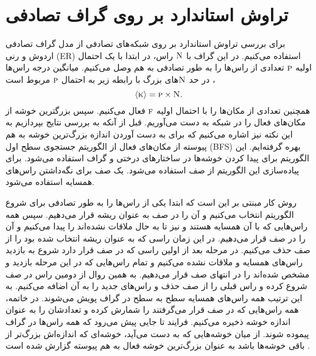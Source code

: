 \section{تراوش استاندارد بر روی گراف تصادفی}
   برای بررسی تراوش استاندارد بر روی شبکه‌های تصادفی از مدل گراف تصادفی اردوش و رنی (\textsc{ER}) استفاده می‌کنیم. در این گراف با 
   $\textsc{N}$ 
   راس، در ابتدا با یک احتمال اولیه 
   $\textsc{p}$ 
   تعدادی از راس‌ها را به طور تصادفی به هم وصل می‌کنیم. میانگین درجه راس‌ها در حد 
   $\textsc{N}$های بزرگ با رابطه زیر به احتمال
    $\textsc{p}$
     مربوط است \cite{newman}، 
   \begin{equation}
   {\left\langle \textsc{k} \right\rangle = \textsc{p}\times \textsc{N}}.
   \end{equation}
   همچنین تعدادی از مکان‌ها را با احتمال اولیه $\textsc{f}$ فعال می‌کنیم. سپس بزرگترین خوشه از مکان‌های فعال را در شبکه به دست می‌آوریم. 
    قبل از آنکه به بررسی نتایج بپردازیم به این نکته نیز اشاره می‌کنیم که برای به دست آوردن اندازه بزرگ‌ترین خوشه به هم پیوسته از مکان‌های فعال از الگوریتم جستجوی سطح اول (‌BFS) بهره گرفته‌ایم. این الگوریتم برای پیدا کردن خوشه‌ها در ساختار‌های درختی و گراف استفاده می‌شود. برای پیاده‌سازی این الگوریتم از صف استفاده می‌شود. یک صف برای نگه‌داشتن راس‌های همسایه استفاده می‌شود. 
   
   روش کار مبنتی بر این است که ابتدا یکی از راس‌ها را به طور تصادفی برای شروع الگوریتم انتخاب می‌کنیم و آن را در صف به عنوان ریشه قرار می‌دهیم. سپس همه راس‌هایی که با آن همسایه هستند و نیز تا به حال ملاقات نشده‌اند را پیدا می‌کنیم و آن را در  صف قرار می‌دهیم. در این زمان راسی که به عنوان ریشه انتخاب شده بود را از صف حذف می‌کنیم. در مرحله بعد از اولین راسی که در صف قرار دارد شروع به بازدید راس‌های همسایه و ملاقات نشده می‌کنیم و تمام راس‌هایی که  در این مرحله بازدید و  مشخص شده‌اند را در انتهای صف قرار می‌دهیم. به همین روال از دومین  راس در صف شروع کرده و راس قبلی را از صف حذف و راس‌های جدید را به آن اضافه می‌کنیم. به این ترتیب همه راس‌های همسایه سطح به سطح در گراف پویش می‌شوند. در خاتمه، همه  راس‌هایی که در صف قرار می‌گرفتند را شمارش کرده و تعدادشان را به عنوان اندازه خوشه ذخیره می‌کنیم. فرایند تا جایی پیش می‌رود که همه راس‌ها در گراف پیموده شوند. از میان خوشه‌هایی که به دست می‌آید، خوشه‌ای که اندازه‌اش بزرگ‌تر از باقی خوشه‌ها باشد به عنوان بزرگ‌ترین خوشه فعال به هم پیوسته گزارش شده است  \cite{zu,newman}.
   
